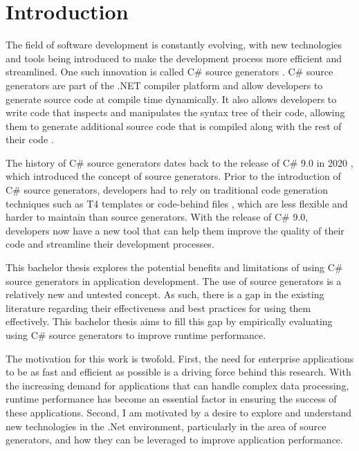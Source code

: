 \chapter{Introduction}

The field of software development is constantly evolving, with new technologies and tools being introduced to make the development process more efficient and streamlined. One such innovation is called C\# source generators \cite{Microsoft2022SourceGenerators}. C\# source generators are part of the .NET compiler platform \cite{Vermeir2022.NETPlatform} and allow developers to generate source code at compile time dynamically. It also allows developers to write code that inspects and manipulates the syntax tree of their code, allowing them to generate additional source code that is compiled along with the rest of their code \cite{Microsoft2022SourceGenerators, Slimak2022SourceSLIMAK, Franz2022TrendsCompilerbau}.

The history of C\# source generators dates back to the release of C\# 9.0 in 2020 \cite{Slimak2022SourceSLIMAK}, which introduced the concept of source generators. Prior to the introduction of C\# source generators, developers had to rely on traditional code generation techniques such as T4 templates \cite{Syriani2018SystematicGeneration} or code-behind files \cite{Tran2010UsingGeneration}, which are less flexible and harder to maintain than source generators. With the release of C\# 9.0, developers now have a new tool that can help them improve the quality of their code and streamline their development processes.

This bachelor thesis explores the potential benefits and limitations of using C\# source generators in application development. The use of source generators is a relatively new and untested concept. As such, there is a gap in the existing literature regarding their effectiveness and best practices for using them effectively. This bachelor thesis aims to fill this gap by empirically evaluating using C\# source generators to improve runtime performance.

The motivation for this work is twofold. First, the need for enterprise applications to be as fast and efficient as possible is a driving force behind this research. With the increasing demand for applications that can handle complex data processing, runtime performance has become an essential factor in ensuring the success of these applications. Second, I am motivated by a desire to explore and understand new technologies in the .Net environment, particularly in the area of source generators, and how they can be leveraged to improve application performance.

